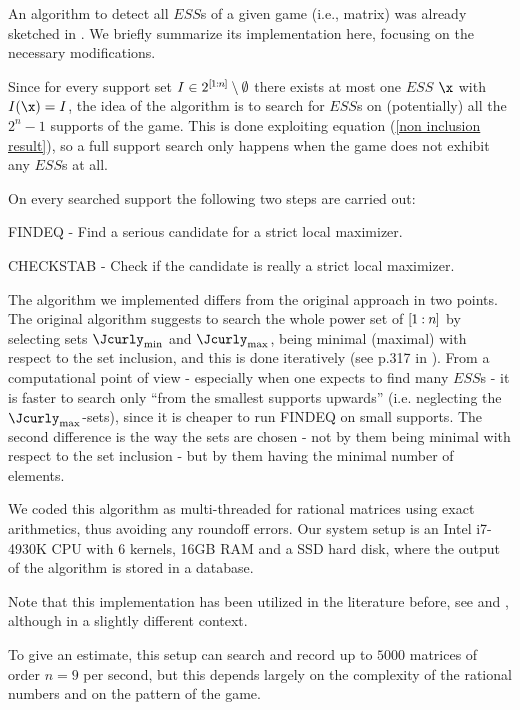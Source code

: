 \documentclass[moor]{informs3}              %
\def\rg#1#2{{ [\kern-.5pt{#1}\kern-.5pt : \kern-.5pt {#2}\kern-.5pt]}}
\begin{document}
An algorithm to detect all $ESS$s of a given game (i.e., matrix) was already sketched in \cite{Bomz92a}.
We briefly summarize its implementation here, focusing on the necessary modifications.

Since for every support set $I \in 2^{\rg 1n}  \setminus \emptyset$ there exists at most one $ESS$ $\x$ with $I(\x)=I$, the idea of the algorithm is to search for $ESS$s on (potentially) all the $2^{n}-1$ supports of the game. This is done exploiting equation (\ref{non inclusion result}), so a full support search only happens when the game does not exhibit any $ESS$s at all.

On every searched support the following two steps are carried out:
\begin{compactenum}
\item FINDEQ - Find a serious candidate for a strict local maximizer.
\item CHECKSTAB - Check if the candidate is really a strict local maximizer.
\end{compactenum}

The algorithm we implemented differs from the original approach in two points. The original algorithm suggests to search the whole power set of $\rg 1n$ by selecting sets $\Jcurly_{\min}$ and $\Jcurly_{\max}$, being minimal (maximal) with respect to the set inclusion, and this is done iteratively (see p.317 in \cite{Bomz92a}). From a computational point of view - especially when one expects to find many $ESS$s - it is faster to search only ``from the smallest supports upwards'' (i.e. neglecting the $\Jcurly_{\max}$-sets), since it is cheaper to run FINDEQ on small supports. The second difference is the way the sets are chosen - not by them being minimal with respect to the set inclusion - but by them having the minimal number of elements.

We coded this algorithm as multi-threaded for rational matrices using exact arithmetics, thus avoiding any roundoff errors.  Our system setup is an Intel i7-4930K CPU with 6 kernels, 16GB RAM and a SSD hard disk, where the output of the algorithm is stored in a database.

Note that this implementation has been utilized in the literature before, see \cite{Bomz14a} and \cite{Bomz14b}, although in a slightly different context.

To give an estimate, this setup can search and record up to $5000$ matrices of order $n=9$ per second, but this depends largely on the complexity of the rational numbers and on the pattern of the game.
\end{document}
